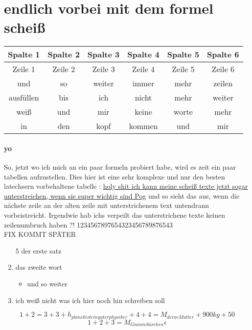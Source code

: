 \documentclass[a4paper]{scrartcl}
\begin{document}
		\section{endlich vorbei mit dem formel scheiß}
		\begin{tabular}{||c||c||c||c||c||c|}
	
			\hline 
			Spalte 1  & Spalte 2 & Spalte 3 & Spalte 4 & Spalte 5 & Spalte 6 \\ 
			\hline 
			Zeile 1  & Zeile 2  & Zeile 3  & Zeile 4 & Zeile 5 & Zeile 6 \\ 
			\hline 
			und  & so  & weiter  & immer  & mehr  & zeilen  \\ 
			\hline 
			ausfüllen & bis  & ich  & nicht  & mehr  & weiter \\ 
			\hline 
			weiß  & und  & mir  & keine  & worte  & mehr \\ 
			\hline 
			in  & den & kopf  & kommen  & und  & mir \\ 
			\hline
		\end{tabular} 
		
		\paragraph{yo}
		So, jetzt wo ich mich an ein paar formeln probiert habe, wird es zeit ein paar tabellen aufzustellen. Dies hier ist eine sehr komplexe und nur den besten latechsern vorbehaltene tabelle :
		\underline{holy shit ich kann meine scheiß texte jetzt sogar unterstreichen, wenn sie super wichtig sind Pog} und so sieht das aus, wenn die nächste zeile an der alten zeile mit
		 unterstrichenem text untendrann vorbeistreicht. Irgendwie hab ichs verpeilt das unterstrichene texte keinen zeilenumbruch haben ?!  1234567897654323456789876543
		 \vspace{20pt}
		  \\ {\huge FIX KOMMT SPÄTER }
		
		
		
		
		\begin{enumerate}
			\item[5] der erste satz
			\item das zweite wort 
			\begin{itemize}
			\item und so weiter
			\end{itemize}
			\item ich weiß nicht was ich hier noch hin schreiben soll
		\end{enumerate}
	
	 $$1+2=3+3+h_{planck ist ein guter physiker}+4+4=M_{deine Mutter}+900 {kg}+50$$
	 \begin{equation}
	 1+2+3=M_{Gummibärchen}
	  \epsilon
	 \end{equation}
\end{document}
